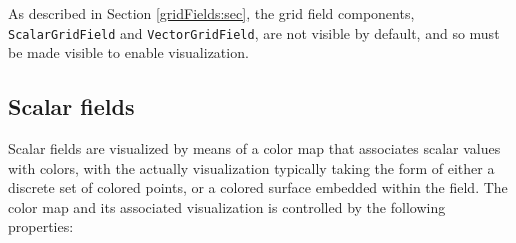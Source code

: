\begin{sideblock}
As described in Section \ref{gridFields:sec}, the grid field
components, {\tt ScalarGridField} and {\tt VectorGridField}, are not
visible by default, and so must be made visible to enable
visualization.
\end{sideblock}

\subsection{Scalar fields}

Scalar fields are visualized by means of a color map that associates
scalar values with colors, with the actually visualization typically
taking the form of either a discrete set of colored points, or a
colored surface embedded within the field. The color map and its
associated visualization is controlled by the following properties:


